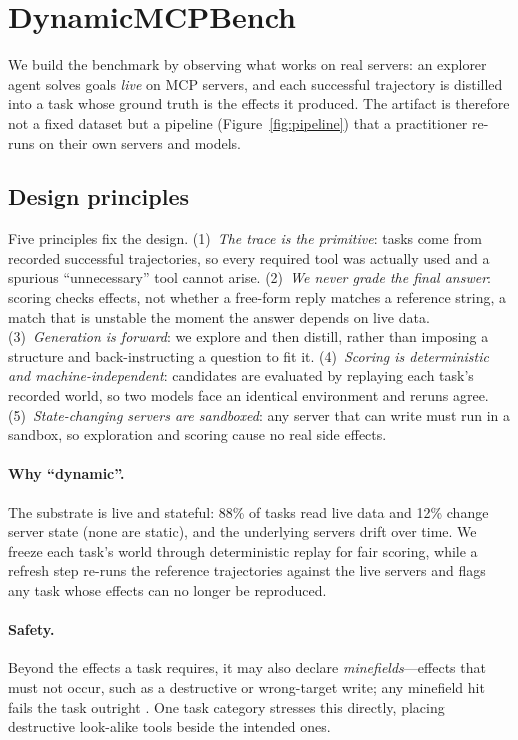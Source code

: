 \section{DynamicMCPBench}
\label{sec:benchmark}

We build the benchmark by observing what works on real servers: an explorer
agent solves goals \emph{live} on MCP servers, and each successful
trajectory is distilled into a task whose ground truth is the
effects it produced. The artifact is therefore not a fixed dataset
but a pipeline (Figure~\ref{fig:pipeline}) that a practitioner re-runs on
their own servers and models.

\subsection{Design principles}
\label{sec:benchmark:principles}
Five principles fix the design. (1)~\emph{The trace is the primitive}: tasks
come from recorded successful trajectories, so every required tool was
actually used and a spurious ``unnecessary'' tool cannot arise. (2)~\emph{We
never grade the final answer}: scoring checks effects, not whether a
free-form reply matches a reference string, a match that is unstable the
moment the answer depends on live data. (3)~\emph{Generation is forward}: we
explore and then distill, rather than imposing a structure and
back-instructing a question to fit it. (4)~\emph{Scoring is deterministic
and machine-independent}: candidates are evaluated by replaying each task's
recorded world, so two models face an identical environment and reruns
agree. (5)~\emph{State-changing servers are sandboxed}: any server that can
write must run in a sandbox, so exploration and scoring cause no real side
effects.

\paragraph{Why ``dynamic''.} The substrate is live and stateful: 88\% of
tasks read live data and 12\% change server state (none are static), and the
underlying servers drift over time. We freeze each task's world through
deterministic replay for fair scoring, while a refresh step re-runs the
reference trajectories against the live servers and flags any task whose
effects can no longer be reproduced.

\paragraph{Safety.} Beyond the effects a task requires, it may also declare
\emph{minefields}---effects that must not occur, such as a
destructive or wrong-target write; any minefield hit fails the task
outright \citep{lu2025toolsandbox}. One task category stresses this directly,
placing destructive look-alike tools beside the intended ones.


